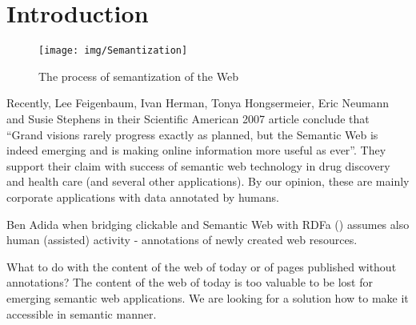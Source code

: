 \documentclass{sig-alternate}
\begin{document}
%


\section{Introduction}

\begin{figure}[b!]
\centering
\texttt{[image: img/Semantization]}
\caption{The process of semantization of the Web}
\label{img:Semantization}
\end{figure}


Recently, Lee Feigenbaum, Ivan Herman, Tonya Hongsermeier, Eric Neumann and Susie Stephens in their Scientific American 2007 article \cite{biblio:feigenbaum_semantic_2007} conclude that ``Grand visions rarely progress exactly as planned, but the Semantic Web is indeed emerging and is making online information more useful as ever''. They support their claim with success of semantic web technology in drug discovery and health care (and several other applications). By our opinion, these are mainly corporate applications with data annotated by humans.

Ben Adida when bridging clickable and Semantic Web with RDFa (\cite{biblio:AdidaClickable}) assumes also human (assisted) activity - annotations of newly created web resources. \par

What to do with the content of the web of today or of pages published without annotations? The content of the web of today is too valuable to be lost for emerging semantic web applications. We are looking for a solution how to make it accessible in semantic manner. \par
\end{document}
